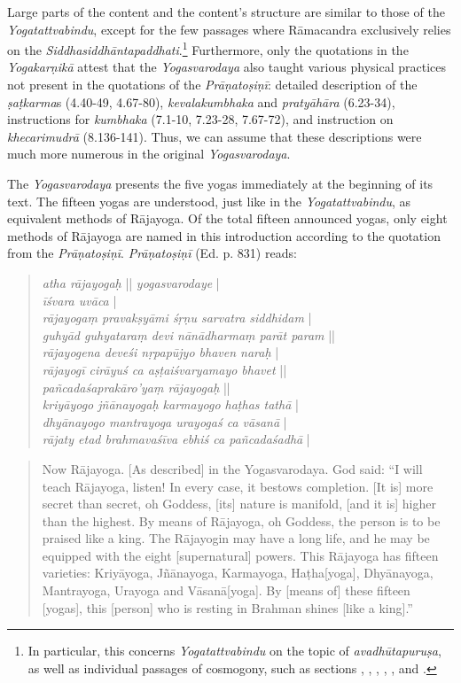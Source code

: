 Large parts of the content and the content's structure are similar to those of the \emph{Yogatattvabindu}, except for the few passages where Rāmacandra exclusively relies on the \emph{Siddhasiddhāntapaddhati}.\footnote{In particular, this concerns \textit{Yogatattvabindu}  on the topic of \textit{avadhūtapuruṣa}, as well as individual passages of cosmogony, such as sections , , , , , and .} Furthermore, only the quotations in the \emph{Yogakarṇikā} attest that the \emph{Yogasvarodaya} also taught various physical practices not present in the quotations of the \emph{Prāṇatoṣiṇī}: detailed description of the \textit{ṣaṭkarma}s (4.40-49, 4.67-80), \textit{kevalakumbhaka} and \textit{pratyāhāra} (6.23-34), instructions for \textit{kumbhaka} (7.1-10, 7.23-28, 7.67-72), and instruction on \textit{khecarimudrā} (8.136-141). Thus, we can assume that these descriptions were much more numerous in the original \emph{Yogasvarodaya}.

The \emph{Yogasvarodaya} presents the five yogas immediately at the beginning of its text. The fifteen yogas are understood, just like in the \emph{Yogatattvabindu}, as equivalent methods of Rājayoga. Of the total fifteen announced yogas, only eight methods of Rājayoga are named in this introduction according to the quotation from the \emph{Prāṇatoṣiṇī}. \emph{Prāṇatoṣiṇī} (Ed. p. 831) reads:

\begin{quote}
  \textit{atha rājayogaḥ} || \textit{yogasvarodaye} | \\
  \textit{īśvara uvāca} |\\
  \textit{rājayogaṃ pravakṣyāmi śṛṇu sarvatra siddhidam} | \\
  \textit{guhyād guhyataraṃ devi nānādharmaṃ parāt param} || \\
  \textit{rājayogena deveśi nṛpapūjyo bhaven naraḥ} |\\
  \textit{rājayogī cirāyuś ca aṣṭaiśvaryamayo bhavet} || \\
  \textit{pañcadaśaprakāro'yaṃ rājayogaḥ} ||\\
  \textit{kriyāyogo jñānayogaḥ karmayogo haṭhas tathā} |\\
  \textit{dhyānayogo mantrayoga urayogaś ca vāsanā} |\\
  \textit{rājaty etad brahmavaśīva ebhiś ca pañcadaśadhā} |
\end{quote}
\begin{quote}
Now Rājayoga. [As described] in the Yogasvarodaya. 
God said: ``I will teach Rājayoga, listen! In every case, it bestows completion. 
[It is] more secret than secret, oh Goddess, [its] nature is manifold, [and it is] higher than the highest. 
By means of Rājayoga, oh Goddess, the person is to be praised like a king.
The Rājayogin may have a long life, and he may be equipped with the eight [supernatural] powers.
This Rājayoga has fifteen varieties:
Kriyāyoga, Jñānayoga, Karmayoga, Haṭha[yoga], 
Dhyānayoga, Mantrayoga, Urayoga and Vāsanā[yoga]. 
By [means of] these fifteen [yogas], this [person] who is resting in Brahman shines [like a king].''
\end{quote}

